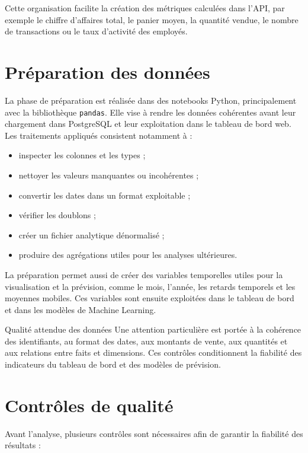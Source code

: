 \documentclass[12pt,a4paper,twoside]{report}
\begin{document}
Cette organisation facilite la création des métriques calculées dans l'API, par exemple le chiffre d'affaires total, le panier moyen, la quantité vendue, le nombre de transactions ou le taux d'activité des employés.

\section{Préparation des données}

La phase de préparation est réalisée dans des notebooks Python, principalement avec la bibliothèque \texttt{pandas}. Elle vise à rendre les données cohérentes avant leur chargement dans PostgreSQL et leur exploitation dans le tableau de bord web. Les traitements appliqués consistent notamment à :

\begin{itemize}
  \item inspecter les colonnes et les types ;
  \item nettoyer les valeurs manquantes ou incohérentes ;
  \item convertir les dates dans un format exploitable ;
  \item vérifier les doublons ;
  \item créer un fichier analytique dénormalisé ;
  \item produire des agrégations utiles pour les analyses ultérieures.
\end{itemize}

La préparation permet aussi de créer des variables temporelles utiles pour la visualisation et la prévision, comme le mois, l'année, les retards temporels et les moyennes mobiles. Ces variables sont ensuite exploitées dans le tableau de bord et dans les modèles de Machine Learning.

\begin{resultbox}{Qualité attendue des données}
Une attention particulière est portée à la cohérence des identifiants, au format des dates, aux montants de vente, aux quantités et aux relations entre faits et dimensions. Ces contrôles conditionnent la fiabilité des indicateurs du tableau de bord et des modèles de prévision.
\end{resultbox}

\section{Contrôles de qualité}

Avant l'analyse, plusieurs contrôles sont nécessaires afin de garantir la fiabilité des résultats :
\end{document}
